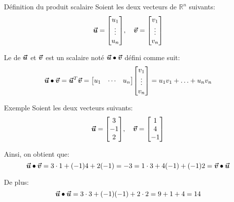 \documentclass[a4paper]{article}
\begin{document}
\begin{parag}{Définition du produit scalaire}
    Soient les deux vecteurs de $\mathbb{R}^n$ suivants:
    \[\bvec{u} = \begin{bmatrix} u_1 \\ \vdots \\ u_n \end{bmatrix}, \mathspace \bvec{v} = \begin{bmatrix} v_1 \\ \vdots \\ v_n \end{bmatrix} \]

    Le  de $\bm{\protect\vec{u}}$ et $\bm{\protect\vec{v}}$ est un scalaire noté $\bm{\protect\vec{u}} \bullet \bm{\protect\vec{v}}$ défini comme suit:
    \[\bvec{u} \dotprod \bvec{v} = \bvec{u}^T \bvec{v} = \begin{bmatrix} u_1 & \cdots & u_n \end{bmatrix} \begin{bmatrix} v_1 \\ \vdots \\ v_n \end{bmatrix} = u_1 v_1 + \ldots + u_n v_n \]
\end{parag}

\begin{parag}{Exemple}
    Soient les deux vecteurs suivants:
    \[\bvec{u} = \begin{bmatrix} 3 \\ -1 \\ 2 \end{bmatrix}, \mathspace \bvec{v} = \begin{bmatrix} 1 \\ 4 \\ -1 \end{bmatrix} \]

    Ainsi, on obtient que:
    \[\bvec{u} \dotprod \bvec{v} = 3\cdot 1 + \left(-1\right)4 + 2\left(-1\right) = -3 = 1\cdot 3 + 4\left(-1\right) + \left(-1\right)2 = \bvec{v} \dotprod \bvec{u}\]

    De plus:
    \[\bvec{u} \dotprod \bvec{u} = 3\cdot 3 + \left(-1\right)\left(-1\right) + 2\cdot 2 = 9 + 1 + 4 = 14\]

\end{parag}
\end{document}
